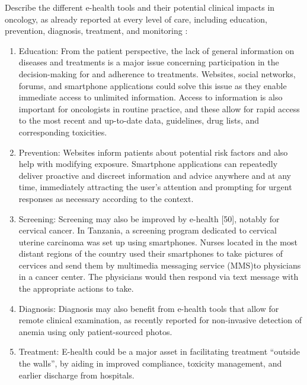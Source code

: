 Describe the different e-health tools and their potential clinical impacts in oncology, as already reported at every level of care, including education, prevention, diagnosis, treatment, and monitoring \cite{bertucci_outpatient_2019}:

\begin{enumerate}
    \item Education: From the patient perspective, the lack of general information on diseases and treatments is a major issue concerning participation in the decision-making for and adherence to treatments. Websites, social networks, forums, and smartphone applications could solve this issue as they enable immediate access to unlimited information. Access to information is also important for oncologists in routine practice, and these allow for rapid access to the most recent and up-to-date data, guidelines, drug lists, and corresponding toxicities.
    \item Prevention: Websites inform patients about potential risk factors and also help with modifying exposure. Smartphone applications can repeatedly deliver proactive and discreet information and advice anywhere and at any time, immediately attracting the user's attention and prompting for urgent responses as necessary according to the context.
    \item Screening: Screening may also be improved by e-health [50], notably for cervical cancer. In Tanzania, a screening program dedicated to cervical uterine carcinoma was set up using smartphones. Nurses located in the most distant regions of the country used their smartphones to take pictures of cervices and send them by multimedia messaging service (MMS)to physicians in a cancer center. The physicians would then respond via text message with the appropriate actions to take.
    \item Diagnosis: Diagnosis may also benefit from e-health tools that allow for remote clinical examination, as recently reported for non-invasive detection of anemia using only patient-sourced photos.
    \item Treatment: E-health could be a major asset in facilitating treatment ``outside the walls'', by aiding in improved compliance, toxicity management, and earlier discharge from hospitals.

\end{enumerate}
